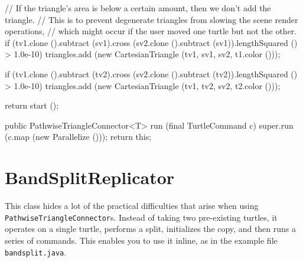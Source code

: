 \documentclass{report}
\begin{document}
\begin{javacode}
{{{        // If the triangle's area is below a certain amount, then we don't add the triangle.
        // This is to prevent degenerate triangles from slowing the scene render operations,
        // which might occur if the user moved one turtle but not the other.
        if (tv1.clone ().subtract (sv1).cross (sv2.clone ().subtract (sv1)).lengthSquared () > 1.0e-10)
          triangles.add (new CartesianTriangle (tv1, sv1, sv2, t1.color ()));

        if (tv1.clone ().subtract (tv2).cross (sv2.clone ().subtract (tv2)).lengthSquared () > 1.0e-10)
          triangles.add (new CartesianTriangle (tv1, tv2, sv2, t2.color ()));
      }

    return start ();
  }

  public PathwiseTriangleConnector<T> run (final TurtleCommand c) {
    super.run (c.map (new Parallelize ()));
    return this;
  }
}
\end{javacode}

\section {BandSplitReplicator} \label{sec:bandsplitreplicator}
      This class hides a lot of the practical difficulties that arise when using {\tt PathwiseTriangleConnector}s. Instead of taking two pre-existing turtles,
      it operates on a single turtle, performs a split, initializes the copy, and then runs a series of commands. This enables you to use it inline, as in the
      example file {\tt bandsplit.java}.
      
\end{document}
